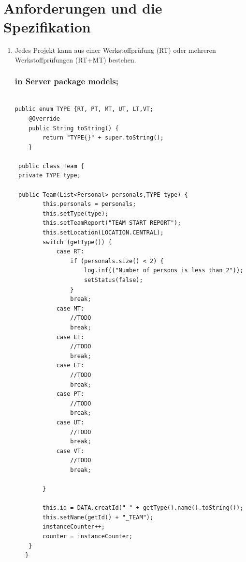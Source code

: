 \section{Anforderungen und die Spezifikation}
\begin{enumerate}
\item Jedes Projekt kann aus einer Werkstoffprüfung (RT) oder mehreren Werkstoffprüfungen
(RT+MT) bestehen.\\
\subsubsection{in Server package models;}

\begin{lstlisting}[frame=single]

public enum TYPE {RT, PT, MT, UT, LT,VT;
    @Override
    public String toString() {
        return "TYPE{}" + super.toString();
    }
    
 public class Team {
 private TYPE type;
 
 public Team(List<Personal> personals,TYPE type) {
        this.personals = personals;
        this.setType(type);
        this.setTeamReport("TEAM START REPORT");
        this.setLocation(LOCATION.CENTRAL);
        switch (getType()) {
            case RT:
                if (personals.size() < 2) {
                    log.inf(("Number of persons is less than 2"));
                    setStatus(false);
                }
                break;
            case MT:
                //TODO
                break;
            case ET:
                //TODO
                break;
            case LT:
                //TODO
                break;
            case PT:
                //TODO
                break;
            case UT:
                //TODO
                break;
            case VT:
                //TODO
                break;

        }

        this.id = DATA.creatId("-" + getType().name().toString());
        this.setName(getId() + "_TEAM");
        instanceCounter++;
        counter = instanceCounter;
    }
   } 

\end{lstlisting}


\end{enumerate}
